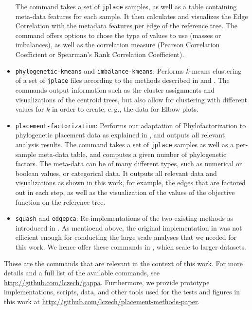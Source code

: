\begin{itemize}
          The command takes a set of \texttt{jplace} samples, as well as a table containing meta-data features for each sample.
          It then calculates and visualizes the Edge Correlation with the metadata features per
          edge of the reference tree.
          The command offers options to chose the type of values to use (masses or imbalances),
          as well as the correlation measure (Pearson Correlation Coefficient or Spearman's Rank Correlation Coefficient).
    \item \texttt{phylogenetic-kmeans} and \texttt{imbalance-kmeans}: Performs $k$-means clustering of a set of \texttt{jplace}
          files according to the methods described in 
          and .
          The commands output information such as the cluster assignments and visualizations of the centroid trees,
          but also allow for clustering with different values for $k$ in order to create, e.\,g.,
          the data for Elbow plots.
    \item \texttt{placement-factorization}:
          Performs our adaptation of Phylofactorization \cite{Washburne2017a} to phylogenetic placement data
          as explained in , and outputs all relevant analysis results.
          The command takes a set of \texttt{jplace} samples as well as a per-sample meta-data table,
          and computes a given number of phylogenetic factors.
          The meta-data can be of many different types, such as numerical or boolean values, or categorical data.
          It outputs all relevant data and visualizations as shown in this work,
          for example, the edges that are factored out in each step, as well as the visualization of the
          values of the objective function on the reference tree.
    \item \texttt{squash} and \texttt{edgepca}:
          Re-implementations of the two existing methods \cite{Matsen2011a,Evans2012} as introduced
          in .
          As mentioend above, the original implementation in  \cite{Matsen2010}
          was not efficient enough for conducting the large scale analyses that we needed for this work.
          We hence offer these commands in , which scale to larger datasets.
\end{itemize}

These are the  commands that are relevant in the context of this work.
For more details and a full list of the available commands, see \url{http://github.com/lczech/gappa}.
Furthermore, we provide prototype implementations, scripts, data, and other tools
used for the tests and figures in this work at \url{http://github.com/lczech/placement-methods-paper}.

